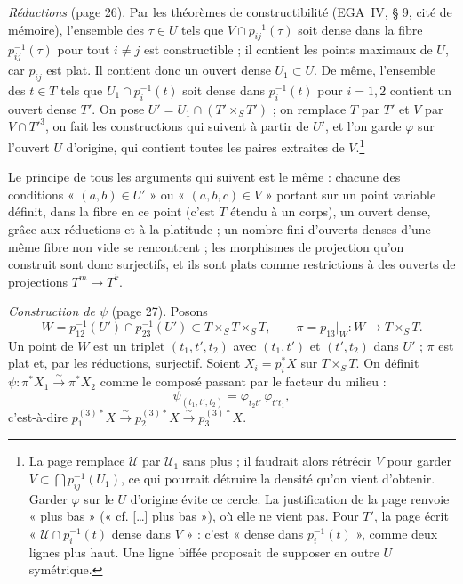 \documentclass[11pt,a4paper]{article}
\begin{document}
\emph{Réductions} (page 26). Par les théorèmes de constructibilité (EGA~IV,
§ 9, cité de mémoire), l'ensemble des $\tau \in U$ tels que $V \cap
p_{ij}^{-1}(\tau)$ soit dense dans la fibre $p_{ij}^{-1}(\tau)$ pour tout $i
\neq j$ est constructible ; il contient les points maximaux de $U$, car $p_{ij}$
est plat. Il contient donc un ouvert dense $U_1 \subset U$. De même, l'ensemble
des $t \in T$ tels que $U_1 \cap p_i^{-1}(t)$ soit dense dans $p_i^{-1}(t)$
pour $i = 1, 2$ contient un ouvert dense $T'$. On pose $U' = U_1 \cap (T'
\times_S T')$ ; on remplace $T$ par $T'$ et $V$ par $V \cap T'^{3}$, on fait
les constructions qui suivent à partir de $U'$, et l'on garde $\varphi$ sur
l'ouvert $U$ d'origine, qui contient toutes les paires extraites de $V$.\footnote{La page remplace $\mathcal{U}$ par $\mathcal{U}_1$
sans plus ; il faudrait alors rétrécir $V$ pour garder $V \subset \bigcap
p_{ij}^{-1}(U_1)$, ce qui pourrait détruire la densité qu'on vient
d'obtenir. Garder $\varphi$ sur le $U$ d'origine évite ce cercle. La
justification de la page renvoie « plus bas » (« cf. […] plus bas »), où elle
ne vient pas. Pour $T'$, la page écrit « $\mathcal{U} \cap p_i^{-1}(t)$ dense
dans $V$ » : c'est « dense dans $p_i^{-1}(t)$ », comme deux lignes plus haut.
Une ligne biffée proposait de supposer en outre $U$ symétrique.}

Le principe de tous les arguments qui suivent est le même : chacune des
conditions « $(a, b) \in U'$ » ou « $(a, b, c) \in V$ » portant sur un point
variable définit, dans la fibre en ce point (c'est $T$ étendu à un corps),
un ouvert dense, grâce aux réductions et à la platitude ; un nombre fini
d'ouverts denses d'une même fibre non vide se rencontrent ; les morphismes
de projection qu'on construit sont donc surjectifs, et ils sont plats comme
restrictions à des ouverts de projections $T^{m} \to T^{k}$.

\emph{Construction de $\psi$} (page 27). Posons
\[
  W = p_{12}^{-1}(U') \cap p_{23}^{-1}(U') \subset T \times_S T \times_S T ,
  \qquad \pi = p_{13}|_W : W \to T \times_S T .
\]
Un point de $W$ est un triplet $(t_1, t', t_2)$ avec $(t_1, t')$ et $(t', t_2)$
dans $U'$ ; $\pi$ est plat et, par les réductions, surjectif. Soient $X_i =
p_i^{*}X$ sur $T \times_S T$. On définit $\psi : \pi^{*}X_1 \xrightarrow{\sim}
\pi^{*}X_2$ comme le composé passant par le facteur du milieu :
\[
  \psi_{(t_1, t', t_2)} = \varphi_{t_2 t'}\,\varphi_{t' t_1} ,
\]
c'est-à-dire $p_1^{(3)*}X \xrightarrow{\sim} p_2^{(3)*}X \xrightarrow{\sim}
p_3^{(3)*}X$.
\end{document}
